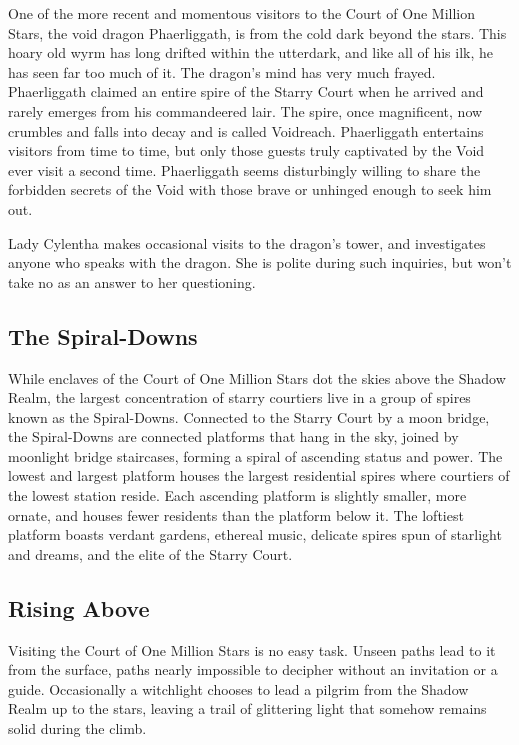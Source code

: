 \documentclass[10pt,a4paper,twoside,bg=print,twocolumn,openany,nodeprecatedcode]{dndbook}
\begin{document}
One of the more recent and momentous visitors to the Court of One Million Stars, the void dragon Phaerliggath, is from the cold dark beyond the stars. This hoary old wyrm has long drifted within the utterdark, and like all of his ilk, he has seen far too much of it. The dragon's mind has very much frayed. Phaerliggath claimed an entire spire of the Starry Court when he arrived and rarely emerges from his commandeered lair. The spire, once magnificent, now crumbles and falls into decay and is called Voidreach. Phaerliggath entertains visitors from time to time, but only those guests truly captivated by the Void ever visit a second time. Phaerliggath seems disturbingly willing to share the forbidden secrets of the Void with those brave or unhinged enough to seek him out.

Lady Cylentha makes occasional visits to the dragon's tower, and investigates anyone who speaks with the dragon. She is polite during such inquiries, but won't take no as an answer to her questioning.

\subsection{The Spiral-Downs}
While enclaves of the Court of One Million Stars dot the skies above the Shadow Realm, the largest concentration of starry courtiers live in a group of spires known as the Spiral-Downs. Connected to the Starry Court by a moon bridge, the Spiral-Downs are connected platforms that hang in the sky, joined by moonlight bridge staircases, forming a spiral of ascending status and power. The lowest and largest platform houses the largest residential spires where courtiers of the lowest station reside. Each ascending platform is slightly smaller, more ornate, and houses fewer residents than the platform below it. The loftiest platform boasts verdant gardens, ethereal music, delicate spires spun of starlight and dreams, and the elite of the Starry Court.

\subsection{Rising Above}
Visiting the Court of One Million Stars is no easy task. Unseen paths lead to it from the surface, paths nearly impossible to decipher without an invitation or a guide. Occasionally a witchlight chooses to lead a pilgrim from the Shadow Realm up to the stars, leaving a trail of glittering light that somehow remains solid during the climb.
\end{document}
